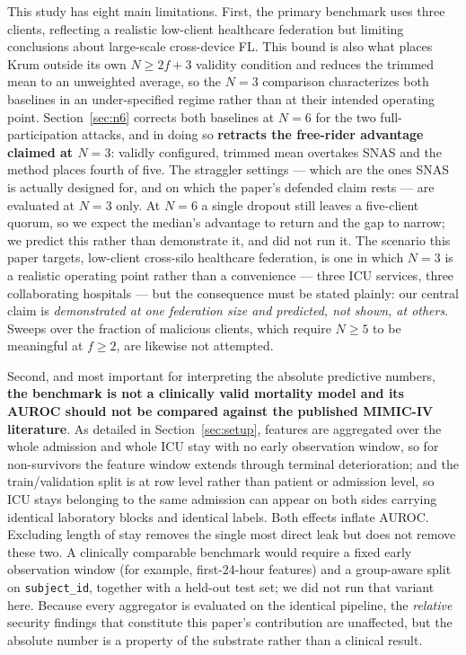 \documentclass[pdflatex,sn-mathphys-num]{sn-jnl}
\begin{document}
This study has eight main limitations. First, the primary benchmark uses three clients, reflecting a realistic low-client healthcare federation but limiting conclusions about large-scale cross-device FL. This bound is also what places Krum outside its own $N\geq2f+3$ validity condition and reduces the trimmed mean to an unweighted average, so the $N=3$ comparison characterizes both baselines in an under-specified regime rather than at their intended operating point. Section~\ref{sec:n6} corrects both baselines at $N=6$ for the two full-participation attacks, and in doing so \textbf{retracts the free-rider advantage claimed at $N=3$}: validly configured, trimmed mean overtakes SNAS and the method places fourth of five. The straggler settings --- which are the ones SNAS is actually designed for, and on which the paper's defended claim rests --- are evaluated at $N=3$ only. At $N=6$ a single dropout still leaves a five-client quorum, so we expect the median's advantage to return and the gap to narrow; we predict this rather than demonstrate it, and did not run it. The scenario this paper targets, low-client cross-silo healthcare federation, is one in which $N=3$ is a realistic operating point rather than a convenience --- three ICU services, three collaborating hospitals --- but the consequence must be stated plainly: our central claim is \emph{demonstrated at one federation size and predicted, not shown, at others}. Sweeps over the fraction of malicious clients, which require $N\geq5$ to be meaningful at $f\geq2$, are likewise not attempted.

Second, and most important for interpreting the absolute predictive numbers, \textbf{the benchmark is not a clinically valid mortality model and its AUROC should not be compared against the published MIMIC-IV literature}. As detailed in Section~\ref{sec:setup}, features are aggregated over the whole admission and whole ICU stay with no early observation window, so for non-survivors the feature window extends through terminal deterioration; and the train/validation split is at row level rather than patient or admission level, so ICU stays belonging to the same admission can appear on both sides carrying identical laboratory blocks and identical labels. Both effects inflate AUROC. Excluding length of stay removes the single most direct leak but does not remove these two. A clinically comparable benchmark would require a fixed early observation window (for example, first-24-hour features) and a group-aware split on \texttt{subject\_id}, together with a held-out test set; we did not run that variant here. Because every aggregator is evaluated on the identical pipeline, the \emph{relative} security findings that constitute this paper's contribution are unaffected, but the absolute number is a property of the substrate rather than a clinical result.
\end{document}
